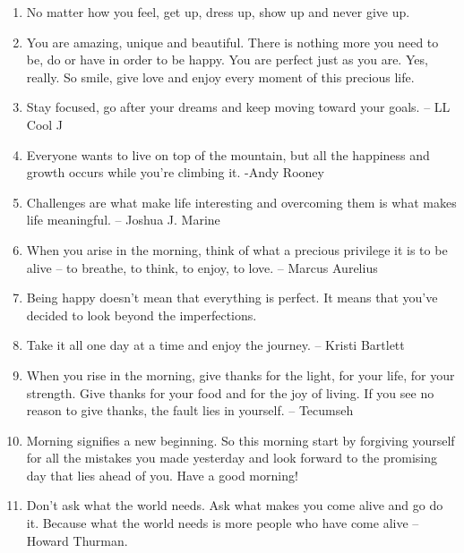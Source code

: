 \begin{enumerate}
            \item No matter how you feel, get up, dress up, show up and never give up.

            \item You are amazing, unique and beautiful. There is nothing more you need to be, do or have in order to be happy. You are perfect just as you are. Yes, really. So smile, give love and enjoy every moment of this precious life.

            \item Stay focused, go after your dreams and keep moving toward your goals. – LL Cool J

            \item Everyone wants to live on top of the mountain, but all the happiness and growth occurs while you’re climbing it. -Andy Rooney

            \item Challenges are what make life interesting and overcoming them is what makes life meaningful. – Joshua J. Marine

            \item When you arise in the morning, think of what a precious privilege it is to be alive – to breathe, to think, to enjoy, to love. – Marcus Aurelius

            \item Being happy doesn’t mean that everything is perfect. It means that you’ve decided to look beyond the imperfections.

            \item Take it all one day at a time and enjoy the journey. – Kristi Bartlett

            \item When you rise in the morning, give thanks for the light, for your life, for your strength. Give thanks for your food and for the joy of living. If you see no reason to give thanks, the fault lies in yourself. – Tecumseh

            \item Morning signifies a new beginning. So this morning start by forgiving yourself for all the mistakes you made yesterday and look forward to the promising day that lies ahead of you. Have a good morning!

            \item Don’t ask what the world needs. Ask what makes you come alive and go do it. Because what the world needs is more people who have come alive – Howard Thurman.


\end{enumerate}

